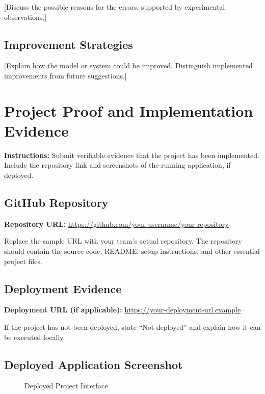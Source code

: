 \documentclass[12pt,a4paper]{report}
\begin{document}
[Discuss the possible reasons for the errors, supported
by experimental observations.]

\section{Improvement Strategies}

[Explain how the model or system could be improved.
Distinguish implemented improvements from future suggestions.]

\chapter{Project Proof and Implementation Evidence}

\textbf{Instructions:}
Submit verifiable evidence that the project has been
implemented. Include the repository link and screenshots
of the running application, if deployed.

\section{GitHub Repository}

\textbf{Repository URL:}
\url{https://github.com/your-username/your-repository}

Replace the sample URL with your team's actual repository.
The repository should contain the source code, README,
setup instructions, and other essential project files.

\section{Deployment Evidence}

\textbf{Deployment URL (if applicable):}
\url{https://your-deployment-url.example}

If the project has not been deployed, state
``Not deployed'' and explain how it can be executed locally.

\section{Deployed Application Screenshot}

\begin{figure}[H]
\centering
{}
\caption{Deployed Project Interface}
\label{fig:deployment}
\end{figure}
\end{document}
